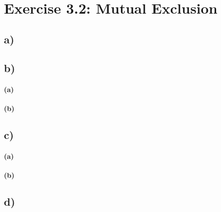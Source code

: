 \documentclass[12pt,a4paper]{article}
\begin{document}
\section*{Exercise 3.2: Mutual Exclusion}
  \subsection*{a)} %
  \subsection*{b)} %
    \paragraph*{(a)} %
    \paragraph*{(b)} %
  \subsection*{c)} %
    \paragraph*{(a)} %
    \paragraph*{(b)} %
  \subsection*{d)} %
\end{document}
